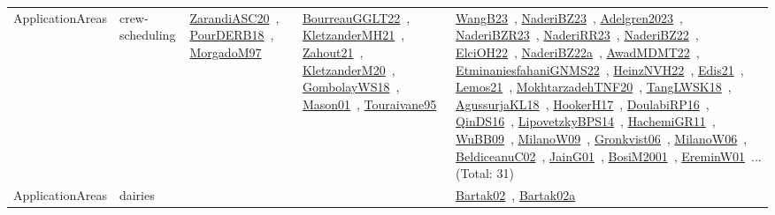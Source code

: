 {\begin{longtable}{lp{3cm}>{\raggedright\arraybackslash}p{6cm}>{\raggedright\arraybackslash}p{6cm}>{\raggedright\arraybackslash}p{8cm}}
ApplicationAreas & crew-scheduling & \href{../works/ZarandiASC20.pdf}{ZarandiASC20}~\cite{ZarandiASC20}, \href{../works/PourDERB18.pdf}{PourDERB18}~\cite{PourDERB18}, \href{../works/MorgadoM97.pdf}{MorgadoM97}~\cite{MorgadoM97} & \href{../works/BourreauGGLT22.pdf}{BourreauGGLT22}~\cite{BourreauGGLT22}, \href{../works/KletzanderMH21.pdf}{KletzanderMH21}~\cite{KletzanderMH21}, \href{../works/Zahout21.pdf}{Zahout21}~\cite{Zahout21}, \href{../works/KletzanderM20.pdf}{KletzanderM20}~\cite{KletzanderM20}, \href{../works/GombolayWS18.pdf}{GombolayWS18}~\cite{GombolayWS18}, \href{../works/Mason01.pdf}{Mason01}~\cite{Mason01}, \href{../works/Touraivane95.pdf}{Touraivane95}~\cite{Touraivane95} & \href{../works/WangB23.pdf}{WangB23}~\cite{WangB23}, \href{../works/NaderiBZ23.pdf}{NaderiBZ23}~\cite{NaderiBZ23}, \href{../works/Adelgren2023.pdf}{Adelgren2023}~\cite{Adelgren2023}, \href{../works/NaderiBZR23.pdf}{NaderiBZR23}~\cite{NaderiBZR23}, \href{../works/NaderiRR23.pdf}{NaderiRR23}~\cite{NaderiRR23}, \href{../works/NaderiBZ22.pdf}{NaderiBZ22}~\cite{NaderiBZ22}, \href{../works/ElciOH22.pdf}{ElciOH22}~\cite{ElciOH22}, \href{../works/NaderiBZ22a.pdf}{NaderiBZ22a}~\cite{NaderiBZ22a}, \href{../works/AwadMDMT22.pdf}{AwadMDMT22}~\cite{AwadMDMT22}, \href{../works/EtminaniesfahaniGNMS22.pdf}{EtminaniesfahaniGNMS22}~\cite{EtminaniesfahaniGNMS22}, \href{../works/HeinzNVH22.pdf}{HeinzNVH22}~\cite{HeinzNVH22}, \href{../works/Edis21.pdf}{Edis21}~\cite{Edis21}, \href{../works/Lemos21.pdf}{Lemos21}~\cite{Lemos21}, \href{../works/MokhtarzadehTNF20.pdf}{MokhtarzadehTNF20}~\cite{MokhtarzadehTNF20}, \href{../works/TangLWSK18.pdf}{TangLWSK18}~\cite{TangLWSK18}, \href{../works/AgussurjaKL18.pdf}{AgussurjaKL18}~\cite{AgussurjaKL18}, \href{../works/HookerH17.pdf}{HookerH17}~\cite{HookerH17}, \href{../works/DoulabiRP16.pdf}{DoulabiRP16}~\cite{DoulabiRP16}, \href{../works/QinDS16.pdf}{QinDS16}~\cite{QinDS16}, \href{../works/LipovetzkyBPS14.pdf}{LipovetzkyBPS14}~\cite{LipovetzkyBPS14}, \href{../works/HachemiGR11.pdf}{HachemiGR11}~\cite{HachemiGR11}, \href{../works/WuBB09.pdf}{WuBB09}~\cite{WuBB09}, \href{../works/MilanoW09.pdf}{MilanoW09}~\cite{MilanoW09}, \href{../works/Gronkvist06.pdf}{Gronkvist06}~\cite{Gronkvist06}, \href{../works/MilanoW06.pdf}{MilanoW06}~\cite{MilanoW06}, \href{../works/BeldiceanuC02.pdf}{BeldiceanuC02}~\cite{BeldiceanuC02}, \href{../works/JainG01.pdf}{JainG01}~\cite{JainG01}, \href{../works/BosiM2001.pdf}{BosiM2001}~\cite{BosiM2001}, \href{../works/EreminW01.pdf}{EreminW01}~\cite{EreminW01}... (Total: 31)\\
ApplicationAreas & dairies &  &  & \href{../works/Bartak02.pdf}{Bartak02}~\cite{Bartak02}, \href{../works/Bartak02a.pdf}{Bartak02a}~\cite{Bartak02a}\\

\end{longtable}}
